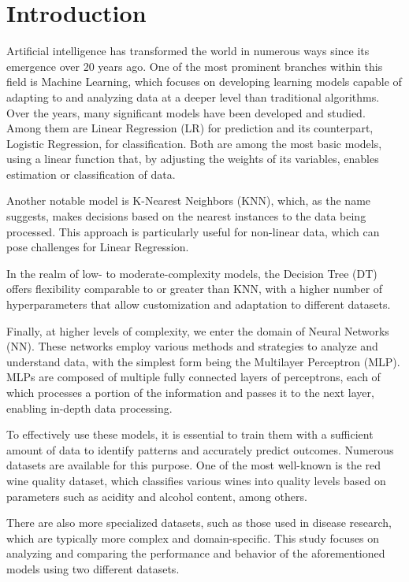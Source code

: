 \documentclass[conference]{IEEEtran}
\begin{document}
\section{Introduction}

Artificial intelligence has transformed the world in numerous ways since its emergence over 20 years ago. One of the most prominent branches within this field is Machine Learning, which focuses on developing learning models capable of adapting to and analyzing data at a deeper level than traditional algorithms. Over the years, many significant models have been developed and studied. Among them are Linear Regression (LR) for prediction and its counterpart, Logistic Regression, for classification. Both are among the most basic models, using a linear function that, by adjusting the weights of its variables, enables estimation or classification of data.

Another notable model is K-Nearest Neighbors (KNN), which, as the name suggests, makes decisions based on the nearest instances to the data being processed. This approach is particularly useful for non-linear data, which can pose challenges for Linear Regression.

In the realm of low- to moderate-complexity models, the Decision Tree (DT) offers flexibility comparable to or greater than KNN, with a higher number of hyperparameters that allow customization and adaptation to different datasets.

Finally, at higher levels of complexity, we enter the domain of Neural Networks (NN). These networks employ various methods and strategies to analyze and understand data, with the simplest form being the Multilayer Perceptron (MLP). MLPs are composed of multiple fully connected layers of perceptrons, each of which processes a portion of the information and passes it to the next layer, enabling in-depth data processing.
    
To effectively use these models, it is essential to train them with a sufficient amount of data to identify patterns and accurately predict outcomes. Numerous datasets are available for this purpose. One of the most well-known is the red wine quality dataset, which classifies various wines into quality levels based on parameters such as acidity and alcohol content, among others.

There are also more specialized datasets, such as those used in disease research, which are typically more complex and domain-specific. This study focuses on analyzing and comparing the performance and behavior of the aforementioned models using two different datasets.
\end{document}
